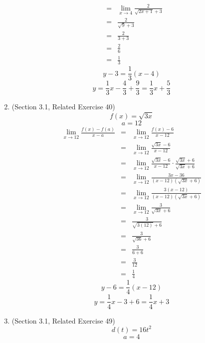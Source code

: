 \documentclass{article}
\begin{document}
\begin{enumerate}
\begin{eqnarray}
                                                &=& \lim_{x \to 4}{\frac{2}{\sqrt{2x + 1} + 3}} \\
                                                &=& \frac{2}{\sqrt{9} + 3} \\
                                                &=& \frac{2}{3 + 3} \\
                                                &=& \frac{2}{6} \\
                                                &=& \frac{1}{3}
    \end{eqnarray}
    $$y - 3 = \frac{1}{3}(x - 4)$$
    $$y = \frac{1}{3}x - \frac{4}{3} + \frac{9}{3} = \frac{1}{3}x + \frac{5}{3}$$
    \item (Section 3.1, Related Exercise 40)
    $$f(x) = \sqrt{3x}$$
    $$a = 12$$
    \begin{eqnarray}
        \lim_{x \to 12}{\frac{f(x) - f(a)}{x - a}} &=& \lim_{x \to 12}{\frac{f(x) - 6}{x - 12}} \\
                                                 &=& \lim_{x \to 12}{\frac{\sqrt{3x} - 6}{x - 12}} \\
                                                 &=& \lim_{x \to 12}{\frac{\sqrt{3x} - 6}{x - 12} \cdot \frac{\sqrt{3x} + 6}{\sqrt{3x} + 6}} \\
                                                 &=& \lim_{x \to 12}{\frac{3x - 36}{(x - 12)(\sqrt{3x} + 6)}} \\
                                                 &=& \lim_{x \to 12}{\frac{3(x - 12)}{(x - 12)(\sqrt{3x} + 6)}} \\
                                                 &=& \lim_{x \to 12}{\frac{3}{\sqrt{3x} + 6}} \\
                                                 &=& \frac{3}{\sqrt{3(12)} + 6} \\
                                                 &=& \frac{3}{\sqrt{36} + 6} \\
                                                 &=& \frac{3}{6 + 6} \\
                                                 &=& \frac{3}{12} \\
                                                 &=& \frac{1}{4}
    \end{eqnarray}
    $$y - 6 = \frac{1}{4}(x - 12)$$
    $$y = \frac{1}{4}x - 3 + 6 = \frac{1}{4}x + 3$$
    \item (Section 3.1, Related Exercise 49)
    $$d(t) = 16t^2$$
    $$a = 4$$

\end{enumerate}
\end{document}
